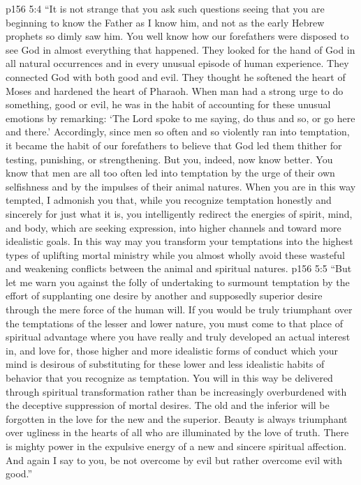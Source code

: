 \vs p156 5:4 \textcolor{ubdarkred}{“It is not strange that you ask such questions seeing that you are beginning to know the Father as I know him, and not as the early Hebrew prophets so dimly saw him. You well know how our forefathers were disposed to see God in almost everything that happened. They looked for the hand of God in all natural occurrences and in every unusual episode of human experience. They connected God with both good and evil. They thought he softened the heart of Moses and hardened the heart of Pharaoh. When man had a strong urge to do something, good or evil, he was in the habit of accounting for these unusual emotions by remarking: ‘The Lord spoke to me saying, do thus and so, or go here and there.’ Accordingly, since men so often and so violently ran into temptation, it became the habit of our forefathers to believe that God led them thither for testing, punishing, or strengthening. But you, indeed, now know better. You know that men are all too often led into temptation by the urge of their own selfishness and by the impulses of their animal natures. When you are in this way tempted, I admonish you that, while you recognize temptation honestly and sincerely for just what it is, you intelligently redirect the energies of spirit, mind, and body, which are seeking expression, into higher channels and toward more idealistic goals. In this way may you transform your temptations into the highest types of uplifting mortal ministry while you almost wholly avoid these wasteful and weakening conflicts between the animal and spiritual natures.}
\vs p156 5:5 \textcolor{ubdarkred}{“But let me warn you against the folly of undertaking to surmount temptation by the effort of supplanting one desire by another and supposedly superior desire through the mere force of the human will. If you would be truly triumphant over the temptations of the lesser and lower nature, you must come to that place of spiritual advantage where you have really and truly developed an actual interest in, and love for, those higher and more idealistic forms of conduct which your mind is desirous of substituting for these lower and less idealistic habits of behavior that you recognize as temptation. You will in this way be delivered through spiritual transformation rather than be increasingly overburdened with the deceptive suppression of mortal desires. The old and the inferior will be forgotten in the love for the new and the superior. Beauty is always triumphant over ugliness in the hearts of all who are illuminated by the love of truth. There is mighty power in the expulsive energy of a new and sincere spiritual affection. And again I say to you, be not overcome by evil but rather overcome evil with good.”}
